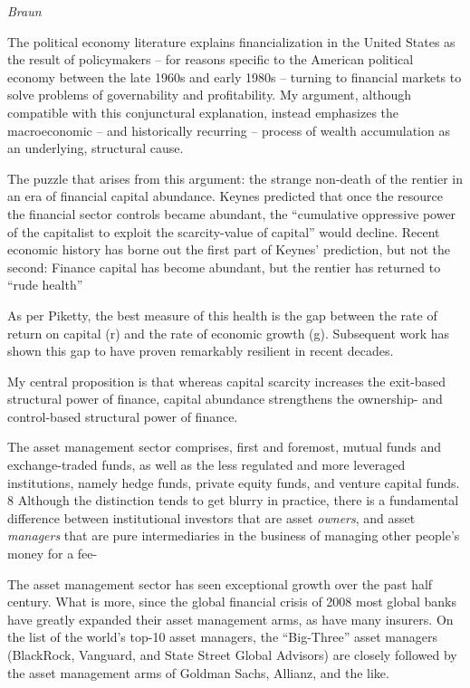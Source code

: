 \documentclass[
]{book}
\begin{document}
\emph{Braun}

The political economy literature explains
financialization in the United States as the result of policymakers -- for reasons specific
to the American political economy between the late 1960s and early 1980s -- turning to
financial markets to solve problems of governability and profitability. My argument,
although compatible with this conjunctural explanation, instead emphasizes the
macroeconomic -- and historically recurring -- process of wealth accumulation as an
underlying, structural cause.

The puzzle that arises from this
argument: the strange non-death of the rentier in an era of financial capital abundance.
Keynes predicted that once the resource the financial sector controls became abundant,
the ``cumulative oppressive power of the capitalist to exploit the scarcity-value of capital''
would decline. Recent economic history has borne out the first part of Keynes' prediction,
but not the second: Finance capital has become abundant, but the rentier has returned
to ``rude health''

As per Piketty, the best measure of this
health is the gap between the rate of return on capital (r) and the rate of economic
growth (g). Subsequent work has shown this gap to have proven
remarkably resilient in recent decades.

My central proposition is that whereas capital scarcity increases the exit-based structural
power of finance, capital abundance strengthens the ownership- and control-based
structural power of finance.

The asset management sector comprises, first and
foremost, mutual funds and exchange-traded funds, as well as the less regulated and
more leveraged institutions, namely hedge funds, private equity funds, and venture
capital funds. 8 Although the distinction tends to get blurry in practice, there is a
fundamental difference between institutional investors that are asset \emph{owners}, and asset
\emph{managers} that are pure intermediaries in the business of managing other people's money
for a fee-

The asset management sector has seen exceptional growth over the
past half century. What is more, since the global financial crisis of 2008 most global
banks have greatly expanded their asset management arms, as have many insurers. On
the list of the world's top-10 asset managers, the ``Big-Three'' asset managers
(BlackRock, Vanguard, and State Street Global Advisors) are closely followed by the
asset management arms of Goldman Sachs, Allianz, and the like.
\end{document}
